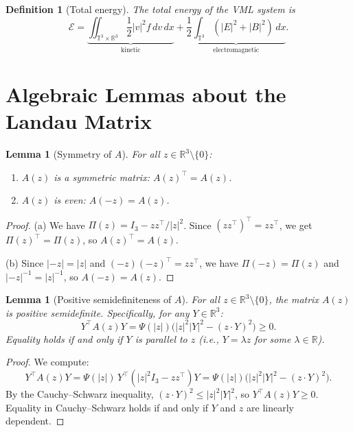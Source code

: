 \documentclass[11pt]{article}
\newcommand{\R}{\mathbb{R}}
\newcommand{\T}{\mathbb{T}}
\newtheorem{lemma}[theorem]{Lemma}
\newtheorem{definition}[theorem]{Definition}
\begin{document}
\begin{definition}[Total energy]
\label{def:total_energy}
The \emph{total energy} of the VML system is
\[
\mathcal{E} = \underbrace{\iint_{\T^3 \times \R^3} \frac{1}{2}|v|^2 f \, dv \, dx}_{\text{kinetic}} + \underbrace{\frac{1}{2}\int_{\T^3}(|E|^2 + |B|^2) \, dx}_{\text{electromagnetic}}.
\]
\end{definition}

\section{Algebraic Lemmas about the Landau Matrix}
\label{sec:algebraic}

\begin{lemma}[Symmetry of $A$]
\label{lem:A_symmetric}
For all $z \in \R^3 \setminus \{0\}$:
\begin{enumerate}[label=(\alph*)]
\item $A(z)$ is a symmetric matrix: $A(z)^\top = A(z)$.
\item $A(z)$ is even: $A(-z) = A(z)$.
\end{enumerate}
\end{lemma}

\begin{proof}
(a) We have $\Pi(z) = I_3 - z z^\top / |z|^2$. Since $(z z^\top)^\top = z z^\top$, we get $\Pi(z)^\top = \Pi(z)$, so $A(z)^\top = A(z)$.

(b) Since $|-z| = |z|$ and $(-z)(-z)^\top = z z^\top$, we have $\Pi(-z) = \Pi(z)$ and $|{-z}|^{-1} = |z|^{-1}$, so $A(-z) = A(z)$.
\end{proof}

\begin{lemma}[Positive semidefiniteness of $A$]
\label{lem:A_psd}
For all $z \in \R^3 \setminus \{0\}$, the matrix $A(z)$ is positive semidefinite. Specifically, for any $Y \in \R^3$:
\[
Y^\top A(z) Y = \Psi(|z|)\big(|z|^2 |Y|^2 - (z \cdot Y)^2\big) \geq 0.
\]
Equality holds if and only if $Y$ is parallel to $z$ (i.e., $Y = \lambda z$ for some $\lambda \in \R$).
\end{lemma}

\begin{proof}
We compute:
\[
Y^\top A(z) Y = \Psi(|z|) \, Y^\top (|z|^2 I_3 - z z^\top) Y = \Psi(|z|)\big(|z|^2 |Y|^2 - (z \cdot Y)^2\big).
\]
By the Cauchy--Schwarz inequality, $(z \cdot Y)^2 \leq |z|^2 |Y|^2$, so $Y^\top A(z) Y \geq 0$. Equality in Cauchy--Schwarz holds if and only if $Y$ and $z$ are linearly dependent.
\end{proof}
\end{document}
